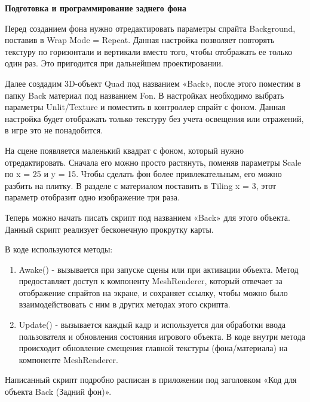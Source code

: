 \documentclass[14pt, oneside]{altsu-report}
\begin{document}
\textbf{Подготовка и программирование заднего фона}

Перед созданием фона нужно отредактировать параметры спрайта Background, поставив в Wrap Mode = Repeat. Данная настройка позволяет повторять текстуру по горизонтали и вертикали вместо того, чтобы отображать ее только один раз. Это пригодится при дальнейшем проектировании.

Далее создадим 3D-объект Quad под названием «Back», после этого поместим в папку Back материал под названием Fon. В настройках необходимо выбрать параметры Unlit/Texture и поместить в контроллер спрайт с фоном. Данная настройка будет отображать только текстуру без учета освещения или отражений, в игре это не понадобится. 

На сцене появляется маленький квадрат с фоном, который нужно отредактировать. Сначала его можно просто растянуть, поменяв параметры Scale по x = 25 и y = 15. Чтобы сделать фон более привлекательным, его можно разбить на плитку. В разделе с материалом поставить в Tiling x = 3, этот параметр отобразит одно изображение три раза.  

Теперь можно начать писать скрипт под названием «Back» для этого объекта. Данный скрипт реализует бесконечную прокрутку карты. 

В коде используются методы:

\begin{enumerate}
\item Awake() - вызывается при запуске сцены или при активации объекта. Метод предоставляет доступ к компоненту MeshRenderer, который отвечает за отображение спрайтов на экране, и сохраняет ссылку, чтобы можно было взаимодействовать с ним в других методах этого скрипта.
\item Update() - вызывается каждый кадр и используется для обработки ввода пользователя и обновления состояния игрового объекта. В коде внутри метода происходит обновление смещения главной текстуры (фона/материала) на компоненте MeshRenderer.
\end{enumerate} 

Написанный скрипт подробно расписан в приложении под заголовком «Код для объекта Back (Задний фон)».
\end{document}
